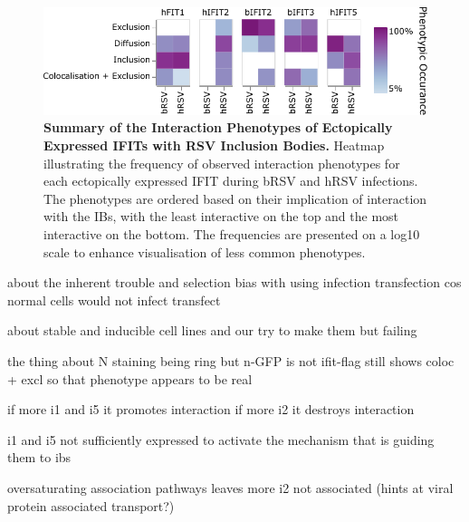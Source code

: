 \begin{figure}
    \label{fig:Distribution_IB_Areas_coInfected_Transfected_Cells_IFIT_RSV}
\end{figure}



\begin{figure}
    \centering
    \includegraphics[width=1\linewidth]{09. Chapter 4/Figs/heatmap-infection-transfection.pdf}
    \caption[Summary of the Interaction Phenotypes of Ectopically Expressed IFITs with RSV Inclusion Bodies.]{\textbf{Summary of the Interaction Phenotypes of Ectopically Expressed IFITs with RSV Inclusion Bodies.} Heatmap illustrating the frequency of observed interaction phenotypes for each ectopically expressed IFIT during bRSV and hRSV infections. The phenotypes are ordered based on their implication of interaction with the IBs, with the least interactive on the top and the most interactive on the bottom. The frequencies are presented on a log10 scale to enhance visualisation of less common phenotypes.}
    \label{fig:Summary of the Interaction Phenotypes of Ectopically Expressed IFITs with RSV Inclusion Bodies}
\end{figure}






about the inherent trouble and selection bias with using infection transfection cos normal cells would not infect transfect

about stable and inducible cell lines and our try to make them but failing






the thing about N staining being ring but n-GFP is not
ifit-flag still shows coloc + excl so that phenotype appears to be real




if more i1 and i5 it promotes interaction
if more i2 it destroys interaction


i1 and i5 not sufficiently expressed to activate the mechanism that is guiding them to ibs

oversaturating association pathways leaves more i2 not associated (hints at viral protein associated transport?)

